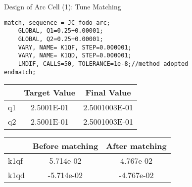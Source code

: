 \documentclass{beamer}
\begin{document}
\begin{frame}[t,fragile]{Design of Arc Cell (1): Tune Matching}
\begin{lstlisting}
match, sequence = JC_fodo_arc;
    GLOBAL, Q1=0.25+0.00001;
    GLOBAL, Q2=0.25+0.00001;
    VARY, NAME= K1QF, STEP=0.000001;
    VARY, NAME= K1QD, STEP=0.000001;
    LMDIF, CALLS=50, TOLERANCE=1e-8;//method adopted 
endmatch;
\end{lstlisting}

\begin{table}
\centering
\begin{tabularx}{0.6\textwidth}{lS[table-format=-1.4e-1]S[table-format=-1.4e-1]}
	\toprule
	  & {Target Value} & {Final Value}  \\ \midrule
	q1 & 2.5001E-01 & 2.5001003E-01 \\
	q2 & 2.5001E-01 & 2.5001003E-01 \\ \bottomrule
\end{tabularx}
\end{table}

\begin{table}
\centering
\begin{tabularx}{0.6\textwidth}{lS[table-format=-1.4e-1]S[table-format=-1.4e-1]}
	\toprule
	     & {Before matching} & {After matching} \\ \midrule
	k1qf & 5.714e-02       & 4.767e-02      \\
	k1qd & -5.714e-02      & -4.767e-02     \\ \bottomrule
\end{tabularx}
\end{table}
\end{frame}
\end{document}
